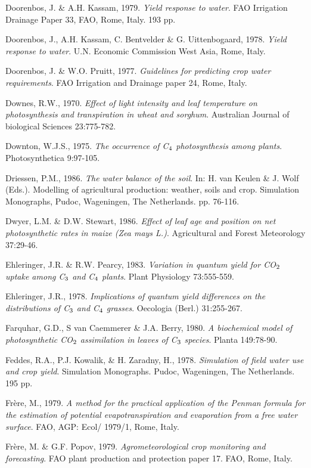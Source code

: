 Doorenbos, J. \& A.H. Kassam, 1979. {\it Yield response to water\/}. FAO Irrigation Drainage
Paper 33, FAO, Rome, Italy. 193 pp.

Doorenbos, J., A.H. Kassam, C. Bentvelder \& G. Uittenbogaard, 1978. {\it Yield response to
water\/}. U.N. Economic Commission West Asia, Rome, Italy.

Doorenbos, J. \& W.O. Pruitt, 1977. {\it Guidelines for predicting crop water requirements\/}.
FAO Irrigation and Drainage paper 24, Rome, Italy.

Downes, R.W., 1970. {\it Effect of light intensity and leaf temperature on photosynthesis and
transpiration in wheat and sorghum\/}. Australian Journal of biological Sciences 23:775-782.

Downton, W.J.S., 1975. {\it The occurrence of C$_{{\rm 4}}$ photosynthesis among plants\/}. Photosynthetica
9:97-105.

Driessen, P.M., 1986. {\it The water balance of the soil\/}. In: H. van Keulen \& J. Wolf (Eds.).
Modelling of agricultural production: weather, soils and crop. Simulation Monographs,
Pudoc, Wageningen, The Netherlands. pp. 76-116.

Dwyer, L.M. \& D.W. Stewart, 1986. {\it Effect of leaf age and position on net photosynthetic
rates in maize (Zea mays L.)\/}. Agricultural and Forest Meteorology 37:29-46.

Ehleringer, J.R. \& R.W. Pearcy, 1983. {\it Variation in quantum yield for CO$_{{\rm 2}}$ uptake among
C$_{{\rm 3}}$ and C$_{{\rm 4}}$ plants\/}. Plant Physiology 73:555-559.

Ehleringer, J.R., 1978. {\it Implications of quantum yield differences on the distributions of C$_{{\rm 3}}$
and C$_{{\rm 4}}$ grasses\/}. Oecologia (Berl.) 31:255-267.

Farquhar, G.D., S van Caemmerer \& J.A. Berry, 1980. {\it A biochemical model of
photosynthetic CO$_{{\rm 2}}$ assimilation in leaves of C$_{{\rm 3}}$ species\/}. Planta 149:78-90.

Feddes, R.A., P.J. Kowalik, \& H. Zaradny, H., 1978. {\it Simulation of field water use and
crop yield\/}. Simulation Monographs. Pudoc, Wageningen, The Netherlands. 195 pp.

Fr\`{e}re, M., 1979. {\it A method for the practical application of the Penman formula for the
estimation of potential evapotranspiration and evaporation from a free water surface\/}. FAO,
AGP: Ecol/ 1979/1, Rome, Italy.

Fr\`{e}re, M. \& G.F. Popov, 1979. {\it Agrometeorological crop monitoring and forecasting\/}. FAO
plant production and protection paper 17. FAO, Rome, Italy.

